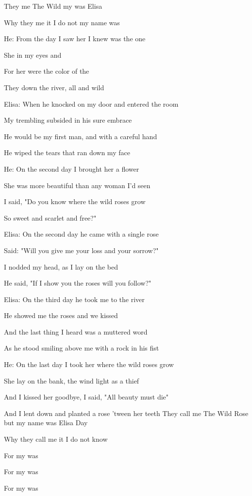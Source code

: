 
\zr
They  me The Wild   my  was Elisa 

Why they  me it I do not   my name was  
\kr

He:
\zs
From the  day I saw her I knew  was the one 

She  in my eyes and 

For her  were the color of the  

They  down the river, all  and wild
\ks

Elisa:
\zs
When he knocked on my door and entered the room

My trembling subsided in his sure embrace

He would be my first man, and with a careful hand

He wiped the tears that ran down my face
\ks

\zr \kr

He:
\zs
On the second day I brought her a flower

She was more beautiful than any woman I'd seen

I said, "Do you know where the wild roses grow

So sweet and scarlet and free?"
\ks


Elisa:
\zs
On the second day he came with a single rose

Said: "Will you give me your loss and your sorrow?"

I nodded my head, as I lay on the bed

He said, "If I show you the roses will you follow?"
\ks

\zr \kr

Elisa:
\zs
On the third day he took me to the river

He showed me the roses and we kissed

And the last thing I heard was a muttered word

As he stood smiling above me with a rock in his fist 
\ks

He:
\zs
On the last day I took her where the wild roses grow

She lay on the bank, the wind light as a thief

And I kissed her goodbye, I said, "All beauty must die"

And I lent down and planted a rose 'tween her teeth 
\ks
\zr
They call me The Wild Rose but my name was Elisa Day

Why they call me it I do not know

For my  was  

For my  was  

For my  was  
\kr

\kp